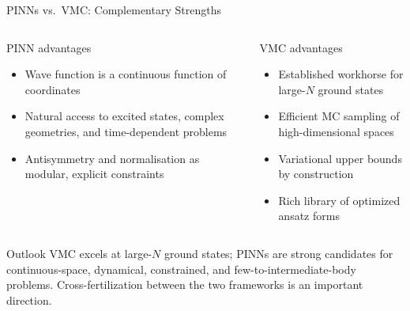 \documentclass[aspectratio=169,10pt]{beamer}
\begin{document}
\begin{frame}{PINNs vs.\ VMC: Complementary Strengths}
  \vspace{0.3cm}
  \begin{columns}[T]
      \begin{block}{PINN advantages}
        \begin{itemize}
          \item Wave function is a continuous function of coordinates
          \item Natural access to excited states, complex geometries,
                and time-dependent problems
          \item Antisymmetry and normalisation as modular, explicit constraints
        \end{itemize}
      \end{block}
      \begin{block}{VMC advantages}
        \begin{itemize}
          \item Established workhorse for large-$N$ ground states
          \item Efficient MC sampling of high-dimensional spaces
          \item Variational upper bounds by construction
          \item Rich library of optimized ansatz forms
        \end{itemize}
      \end{block}
  \end{columns}

  \vspace{0.3cm}
  \begin{alertblock}{Outlook}
    VMC excels at large-$N$ ground states;
    PINNs are strong candidates for continuous-space, dynamical, constrained, and
    few-to-intermediate-body problems.
    Cross-fertilization between the two frameworks is an important direction.
  \end{alertblock}
\end{frame}
\end{document}
